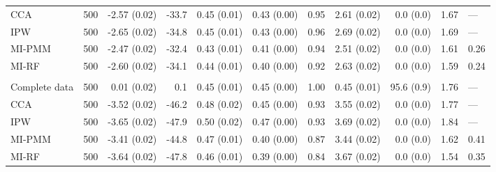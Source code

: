 \begin{longtable}{l|rrrrrrrrrl}
CCA & 500 & -2.57 (0.02) & -33.7 & 0.45 (0.01) & 0.43 (0.00) & 0.95 & 2.61 (0.02) & 0.0 (0.0) & 1.67 & — \\ 
IPW & 500 & -2.65 (0.02) & -34.8 & 0.45 (0.01) & 0.43 (0.00) & 0.96 & 2.69 (0.02) & 0.0 (0.0) & 1.69 & — \\ 
MI-PMM & 500 & -2.47 (0.02) & -32.4 & 0.43 (0.01) & 0.41 (0.00) & 0.94 & 2.51 (0.02) & 0.0 (0.0) & 1.61 & 0.26 \\ 
MI-RF & 500 & -2.60 (0.02) & -34.1 & 0.44 (0.01) & 0.40 (0.00) & 0.92 & 2.63 (0.02) & 0.0 (0.0) & 1.59 & 0.24 \\ 
\midrule\addlinespace[2.5pt]
\multicolumn{11}{l}{Wasting — MNAR 50\%} \\[2.5pt] 
\midrule\addlinespace[2.5pt]
Complete data & 500 & 0.01 (0.02) & 0.1 & 0.45 (0.01) & 0.45 (0.00) & 1.00 & 0.45 (0.01) & 95.6 (0.9) & 1.76 & — \\ 
CCA & 500 & -3.52 (0.02) & -46.2 & 0.48 (0.02) & 0.45 (0.00) & 0.93 & 3.55 (0.02) & 0.0 (0.0) & 1.77 & — \\ 
IPW & 500 & -3.65 (0.02) & -47.9 & 0.50 (0.02) & 0.47 (0.00) & 0.93 & 3.69 (0.02) & 0.0 (0.0) & 1.84 & — \\ 
MI-PMM & 500 & -3.41 (0.02) & -44.8 & 0.47 (0.01) & 0.40 (0.00) & 0.87 & 3.44 (0.02) & 0.0 (0.0) & 1.62 & 0.41 \\ 
MI-RF & 500 & -3.64 (0.02) & -47.8 & 0.46 (0.01) & 0.39 (0.00) & 0.84 & 3.67 (0.02) & 0.0 (0.0) & 1.54 & 0.35 \\ 
\bottomrule
\end{longtable}
\endgroup

